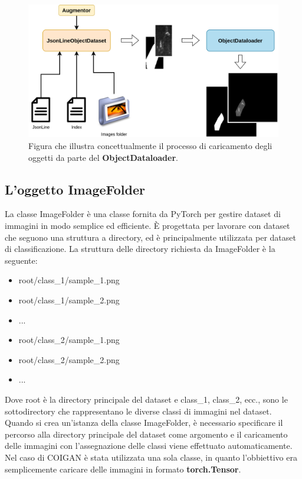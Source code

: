\begin{figure}[H]
    \centering
    \includegraphics[width=1.0\textwidth]{imgs/Coigan/Dataloader_pipeline_example.drawio.png}
    \caption{Figura che illustra concettualmente il processo di caricamento degli oggetti da parte del \textbf{ObjectDataloader}.}
    \label{fig:object_dataloader_sample}
\end{figure}


\subsection{L'oggetto ImageFolder}
La classe ImageFolder è una classe fornita da PyTorch per gestire dataset di immagini in modo semplice ed efficiente. 
È progettata per lavorare con dataset che seguono una struttura a directory, ed è principalmente utilizzata per dataset di classificazione.
La struttura delle directory richiesta da ImageFolder è la seguente:

\begin{itemize}
    \item root/class\_1/sample\_1.png
    \item root/class\_1/sample\_2.png
    \item ...
    \item root/class\_2/sample\_1.png
    \item root/class\_2/sample\_2.png
    \item ...
\end{itemize}

Dove root è la directory principale del dataset e class\_1, class\_2, ecc., sono le sottodirectory che rappresentano le diverse classi di immagini nel dataset.
Quando si crea un'istanza della classe ImageFolder, è necessario specificare il percorso alla directory principale del dataset come argomento
e il caricamento delle immagini con l'assegnazione delle classi viene effettuato automaticamente.
Nel caso di COIGAN è stata utilizzata una sola classe, in quanto l'obbiettivo era semplicemente caricare delle immagini in formato \textbf{torch.Tensor}.



